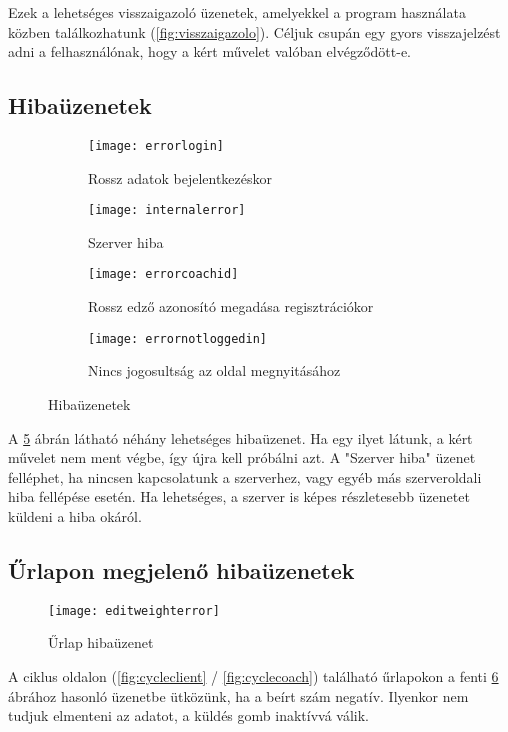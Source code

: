 Ezek a lehetséges visszaigazoló üzenetek, amelyekkel a program használata közben találkozhatunk (\ref{fig:visszaigazolo}). Céljuk csupán egy gyors visszajelzést adni a felhasználónak, hogy a kért művelet valóban elvégződött-e.

\pagebreak

\subsection{Hibaüzenetek}

\begin{figure}[htbp]
	\centering
	\begin{subfigure}[b]{0.3\textwidth}
		\centering
		\texttt{[image: errorlogin]}
		\caption{Rossz adatok bejelentkezéskor}
		\label{fig:errorlogin}
	\end{subfigure}
	\hfill
	\begin{subfigure}[b]{0.3\textwidth}
		\centering
		\texttt{[image: internalerror]}
		\caption{Szerver hiba}
		\label{fig:internalerror}
	\end{subfigure}
	\hfill
	\begin{subfigure}[b]{0.3\textwidth}
		\centering
		\texttt{[image: errorcoachid]}
		\caption{Rossz edző azonosító megadása regisztrációkor}
		\label{fig:errorcoachid}
	\end{subfigure}
	\hfill
	\begin{subfigure}[b]{0.4\textwidth}
		\centering
		\texttt{[image: errornotloggedin]}
		\caption{Nincs jogosultság az oldal megnyitásához}
		\label{fig:errornotloggedin}
	\end{subfigure}
	
	\caption{Hibaüzenetek}
	\label{fig:hiba}
\end{figure}

A \ref{fig:hiba} ábrán látható néhány lehetséges hibaüzenet. Ha egy ilyet látunk, a kért művelet nem ment végbe, így újra kell próbálni azt. A "Szerver hiba" üzenet felléphet, ha nincsen kapcsolatunk a szerverhez, vagy egyéb más szerveroldali hiba fellépése esetén. Ha lehetséges, a szerver is képes részletesebb üzenetet küldeni a hiba okáról.

\subsection{Űrlapon megjelenő hibaüzenetek}

\begin{figure}[H]
	\centering
	\texttt{[image: editweighterror]}
	\caption{Űrlap hibaüzenet}
	\label{fig:editweighterror}
\end{figure}

A ciklus oldalon (\ref{fig:cycleclient} / \ref{fig:cyclecoach}) található űrlapokon a fenti \ref{fig:editweighterror} ábrához hasonló üzenetbe ütközünk, ha a beírt szám negatív. Ilyenkor nem tudjuk elmenteni az adatot, a küldés gomb inaktívvá válik.